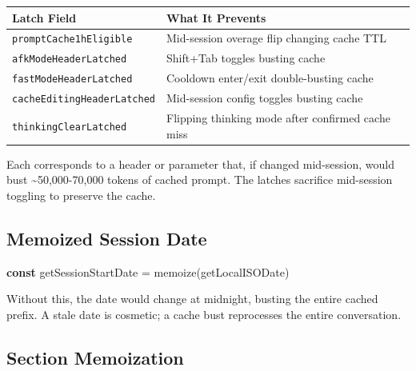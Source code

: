 \documentclass[
  english,
  11pt,
  letterpaper,
]{book}
\newenvironment{Shaded}{\begin{snugshade}}{\end{snugshade}}
\newcommand{\FunctionTok}[1]{\textcolor[rgb]{0.28,0.35,0.67}{#1}}
\newcommand{\KeywordTok}[1]{\textcolor[rgb]{0.00,0.23,0.31}{\textbf{#1}}}
\newcommand{\NormalTok}[1]{\textcolor[rgb]{0.00,0.23,0.31}{#1}}
\newcommand{\OperatorTok}[1]{\textcolor[rgb]{0.37,0.37,0.37}{#1}}
\begin{document}
\begin{longtable}[]{@{}
  >{\raggedright\arraybackslash}p{}
  >{\raggedright\arraybackslash}p{}@{}}
\toprule\noalign{}
\begin{minipage}[b]{\linewidth}\raggedright
Latch Field
\end{minipage} & \begin{minipage}[b]{\linewidth}\raggedright
What It Prevents
\end{minipage} \\
\midrule\noalign{}
\endhead
\bottomrule\noalign{}
\endlastfoot
\texttt{promptCache1hEligible} & Mid-session overage flip changing cache
TTL \\
\texttt{afkModeHeaderLatched} & Shift+Tab toggles busting cache \\
\texttt{fastModeHeaderLatched} & Cooldown enter/exit double-busting
cache \\
\texttt{cacheEditingHeaderLatched} & Mid-session config toggles busting
cache \\
\texttt{thinkingClearLatched} & Flipping thinking mode after confirmed
cache miss \\
\end{longtable}

Each corresponds to a header or parameter that, if changed mid-session,
would bust \textasciitilde50,000-70,000 tokens of cached prompt. The
latches sacrifice mid-session toggling to preserve the cache.

\subsection{Memoized Session Date}\label{memoized-session-date}

\begin{Shaded}
\begin{Highlighting}[]
\KeywordTok{const}\NormalTok{ getSessionStartDate }\OperatorTok{=} \FunctionTok{memoize}\NormalTok{(getLocalISODate)}
\end{Highlighting}
\end{Shaded}

Without this, the date would change at midnight, busting the entire
cached prefix. A stale date is cosmetic; a cache bust reprocesses the
entire conversation.

\subsection{Section Memoization}\label{section-memoization}
\end{document}
